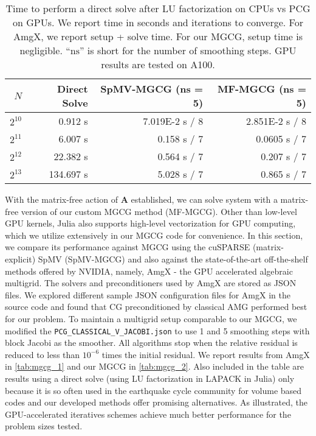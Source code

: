 \begin{table*}
    \caption{Time to perform a direct solve after LU factorization on CPUs vs PCG on GPUs. We report time in seconds and iterations to converge. For AmgX, we report setup + solve time. For our MGCG, setup time is negligible. ``$\mathrm{ns}$'' is short for the number of smoothing steps. GPU results are tested on A100.}
    \small
    \centering
    \begin{tabular}{rrrr}
    \toprule
    $N$     & Direct Solve  & SpMV-MGCG (ns = 5)   & MF-MGCG (ns = 5)\\
    \midrule
    $2^{10}$  &   0.912 s & 7.019E-2 s / 8   & 2.851E-2 s / 8       \\
    $2^{11}$ & 6.007 s &  0.158 s / 7  & 0.0605 s / 7     \\
    $2^{12}$ & 22.382 s  & 0.564 s / 7  & 0.207 s / 7         \\
    $2^{13}$ & 134.697 s  & 5.028 s / 7   & 0.865 s / 7      \\
    \bottomrule
    \end{tabular}
    \label{tab:mgcg_2} 
\end{table*}

With the matrix-free action of $\boldsymbol{A}$ established, we can solve system with a matrix-free version of our custom MGCG method (MF-MGCG). 
Other than low-level GPU kernels, Julia also supports high-level vectorization for GPU computing, which we utilize extensively in our MGCG code for convenience.
In this section, we compare its performance against MGCG using the cuSPARSE (matrix-explicit) SpMV (SpMV-MGCG) and also against the state-of-the-art off-the-shelf methods offered by NVIDIA, namely, AmgX - the GPU accelerated algebraic multigrid. The solvers and preconditioners used by AmgX are stored as JSON files. 
We explored different sample JSON configuration files for AmgX in the source code and found that CG preconditioned by classical AMG performed best for our problem. 
To maintain a multigrid setup comparable to our MGCG, we modified the \texttt{PCG\_CLASSICAL\_V\_JACOBI.json} to use 1 and 5 smoothing steps with block Jacobi as the smoother.
All algorithms stop when the relative residual is reduced to less than $10^{-6}$ times the initial residual.
We report results from AmgX in \autoref{tab:mgcg_1} and our MGCG in \autoref{tab:mgcg_2}. Also included in the table are results using a direct solve (using LU factorization in LAPACK in Julia) only because it is so often used in the earthquake cycle community for volume based codes \citep{erickson2020community} and our developed methods offer promising alternatives. As illustrated, the GPU-accelerated iteratives schemes achieve much better performance for the problem sizes tested.

